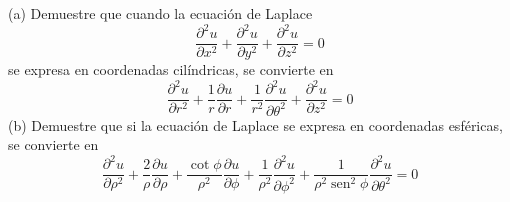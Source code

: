 \item (a) Demuestre que cuando la ecuación de Laplace
\[ \frac{\partial^2 u}{\partial x^2} + \frac{\partial^2 u}{\partial y^2} + \frac{\partial^2 u}{\partial z^2} = 0 \]
se expresa en coordenadas cilíndricas, se convierte en
\[ \frac{\partial^2 u}{\partial r^2} + \frac{1}{r} \frac{\partial u}{\partial r} + \frac{1}{r^2} \frac{\partial^2 u}{\partial \theta^2} + \frac{\partial^2 u}{\partial z^2} = 0 \]
(b) Demuestre que si la ecuación de Laplace se expresa en coordenadas esféricas, se convierte en
\[ \frac{\partial^2 u}{\partial \rho^2} + \frac{2}{\rho} \frac{\partial u}{\partial \rho} + \frac{\cot \phi}{\rho^2} \frac{\partial u}{\partial \phi} + \frac{1}{\rho^2} \frac{\partial^2 u}{\partial \phi^2} + \frac{1}{\rho^2 \operatorname{sen}^2 \phi} \frac{\partial^2 u}{\partial \theta^2} = 0 \]
